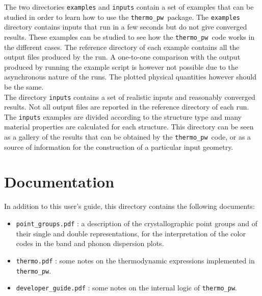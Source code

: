 \documentclass[12pt,a4paper]{article}
\def\thermo{\texttt{thermo\_pw}}
\begin{document}
The two directories \texttt{examples} and \texttt{inputs} contain a set
of examples that can be studied in order to learn how to use the \thermo\ 
package. The \texttt{examples} directory contains inputs that run in a few
seconds but do not give converged results. These examples can be studied 
to see how the \thermo\ code works in the different cases. The
reference directory of each example contains all the output
files produced by the run. A one-to-one comparison with the output
produced by running the example script is however not possible due to the
asynchronous nature of the runs. The plotted physical quantities however
should be the same. \\
The directory \texttt{inputs} contains a set
of realistic inputs and reasonably converged results. Not all
output files are reported in the reference directory of each run.
The \texttt{inputs} examples are divided according to the structure type
and many material properties are calculated for each structure.
This directory can be seen as a gallery of the results that can be
obtained by the \thermo\ code, or as a source of information for the
construction of a particular input geometry.

\section{\color{coral}Documentation}

In addition to this user's guide, this directory contains the following
documents:

\begin{itemize}

\item
\texttt{point\_groups.pdf} : a description of the crystallographic point groups
and of their single and double representations, for the interpretation of
the color codes in the band and phonon dispersion plots.

\item
\texttt{thermo.pdf} : some notes on the thermodynamic expressions implemented
in \texttt{thermo\_pw}.

\item
\texttt{developer\_guide.pdf} : some notes on the internal logic of
\texttt{thermo\_pw}.


\end{itemize}
\end{document}
